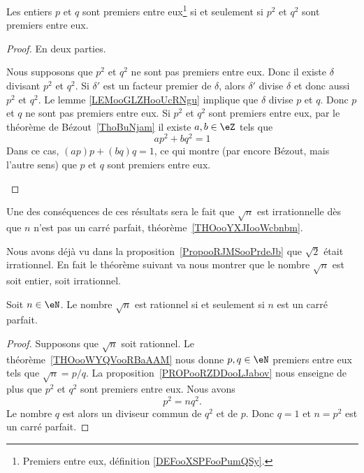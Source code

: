 \begin{proposition}     \label{PROPooRZDDooLJabov}
	Les entiers \( p\) et \( q\) sont premiers entre eux\footnote{Premiers entre eux, définition \ref{DEFooXSPFooPumQSy}.} si et seulement si \( p^2\) et \( q^2\) sont premiers entre eux.
\end{proposition}

\begin{proof}
	En deux parties.
	\begin{subproof}
		\spitem[\( \Rightarrow\)]
		Nous supposons que \( p^2\) et \( q^2\) ne sont pas premiers entre eux. Donc il existe \( \delta\) divisant \( p^2\) et \( q^2\). Si \( \delta'\) est un facteur premier de \( \delta\), alors \( \delta'\) divise \( \delta\) et donc aussi \( p^2\) et \( q^2\). Le lemme \ref{LEMooGLZHooUcRNgu} implique que \( \delta\) divise \( p\) et \( q\). Donc \( p\) et \( q\) ne sont pas premiers entre eux.
		\spitem[\( \Leftarrow\)]
		Si \( p^2\) et \( q^2\) sont premiers entre eux, par le théorème de Bézout~\ref{ThoBuNjam} il existe \( a,b\in \eZ\) tels que
		\begin{equation}
			ap^2+bq^2=1
		\end{equation}
		Dans ce cas, \( (ap)p+(bq)q=1\), ce qui montre (par encore Bézout, mais l'autre sens) que \( p\) et \( q\) sont premiers entre eux.
	\end{subproof}
\end{proof}

Une des conséquences de ces résultats sera le fait que \( \sqrt{n}\) est irrationnelle dès que \( n\) n'est pas un carré parfait, théorème~\ref{THOooYXJIooWcbnbm}.

Nous avons déjà vu dans la proposition~\ref{PropooRJMSooPrdeJb} que \( \sqrt{2}\) était irrationnel. En fait le théorème suivant va nous montrer que le nombre \( \sqrt{ n }\) est soit entier, soit irrationnel.
\begin{theorem}     \label{THOooYXJIooWcbnbm}
	Soit \( n\in \eN\). Le nombre \( \sqrt{n}\) est rationnel si et seulement si \( n\) est un carré parfait.
\end{theorem}

\begin{proof}
	Supposons que \( \sqrt{n}\) soit rationnel. Le théorème~\ref{THOooWYQVooRBaAAM} nous donne \( p,q\in \eN\) premiers entre eux tels que \( \sqrt{n}=p/q\). La proposition~\ref{PROPooRZDDooLJabov} nous enseigne de plus que \( p^2\) et \( q^2\) sont premiers entre eux. Nous avons
	\begin{equation}
		p^2=nq^2.
	\end{equation}
	Le nombre \( q\) est alors un diviseur commun de \( q^2\) et de \( p\). Donc \( q=1\) et \( n=p^2\) est un carré parfait.
\end{proof}

